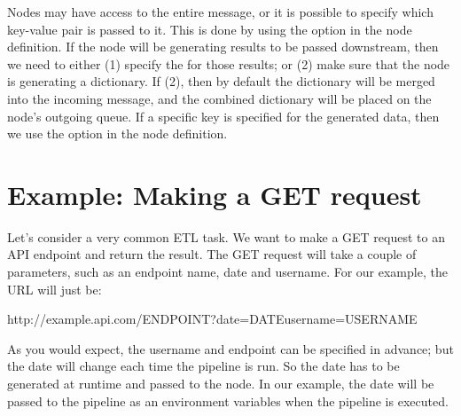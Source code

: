 \documentclass[letterpaper,10pt,english]{sphinxmanual}
\begin{document}
Nodes may have access to the entire message, or it is possible to specify
which key-value pair is passed to it. This is done by using the 
option in the node definition. If the node will be generating results to be
passed downstream, then we need to either (1) specify the for those results; or
(2) make sure that the node is generating a dictionary. If (2), then
by default the dictionary will be merged into the incoming message, and the
combined dictionary will be placed on the node’s outgoing queue. If a specific
key is specified for the generated data, then we use the 
option in the node definition.


\section{Example: Making a GET request}
\label{\detokenize{data_journey:example-making-a-get-request}}
Let’s consider a very common ETL task. We want to make a GET request to an
API endpoint and return the result. The GET request will take a couple of
parameters, such as an endpoint name, date and username. For our example,
the URL will just be:

%
\begin{sphinxVerbatim}[commandchars=\\\{\}]
http://example.api.com/ENDPOINT?date=DATE\PYGZam{}username=USERNAME
\end{sphinxVerbatim}

As you would expect, the username and endpoint can be specified in advance;
but the date will change each time the pipeline is run. So the date has to
be generated at runtime and passed to the node. In our example, the
date will be passed to the pipeline as an environment variables 
when the pipeline is executed.
\end{document}
